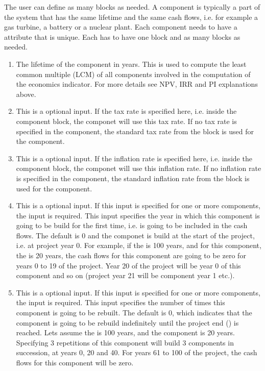 The user can define as many  blocks as needed. A component is typically a part of the system that has the same lifetime and
the same cash flows, i.e. for example a gas turbine, a battery or a nuclear plant. Each component needs to have a  attribute that is unique.
Each  has to have one  block and as many  blocks as needed.

\begin{enumerate}
  \item[\xmlNode{Life\_time}] The lifetime of the component in years. This is used to compute the least common multiple (LCM) of all components involved in the
    computation of the economics indicator. For more details see NPV, IRR and PI explanations above.
  \item[\xmlNode{tax}] This is a optional input. If the tax rate is specified here, i.e. inside the component block, the componet will use this tax rate.
    If no tax rate is specified in the component, the standard tax rate from the  block is used for the component.
  \item[\xmlNode{inflation}] This is a optional input. If the inflation rate is specified here, i.e. inside the component block,
    the componet will use this inflation rate. If no inflation rate is specified in the component, the standard inflation rate from the 
    block is used for the component.
  \item[\xmlNode{StartTime}] This is a optional input. If this input is specified for one or more components, the 
    input  is required. This input specifies the year in which this component is going to be build for the first time,
    i.e. is going to be included in the cash flows. The default is 0 and the componet is build at the start of the project, i.e. at project year 0.
    For example, if the  is 100 years, and for this component, the  is 20 years, the cash flows for this
    component are going to be zero for years 0 to 19 of the project. Year 20 of the project will be year 0 of this component and so on
    (project year 21 will be component year 1 etc.).
  \item[\xmlNode{Repetitions}] This is a optional input. If this input is specified for one or more components, the 
    input  is required. This input specifies the number of times this component is going to be rebuilt. The default is 0,
    which indicates that the component is going to be rebuild indefinitely until the project end () is reached.
    Lets assume the  is 100 years, and the component  is 20 years. Specifying 3 repetitions of this
    component will build 3 components in succession, at years 0, 20 and 40. For years 61 to 100 of the project, the cash flows for this component will be zero.


\end{enumerate}
